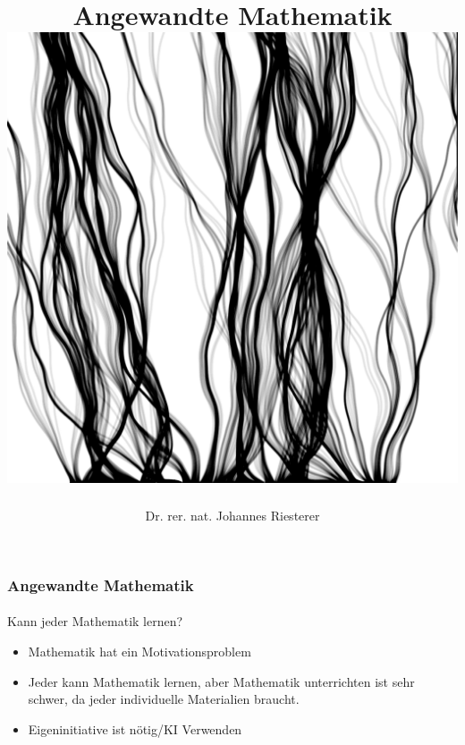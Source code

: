 \documentclass{beamer}
\begin{document}
\title[Angewandte Mathematik] %
{Angewandte Mathematik
\\
\includegraphics[scale=0.15]{images/cover}
}
\subtitle{}
\author[Dr. Johannes Riesterer] %
{Dr.  rer. nat. Johannes Riesterer}

\date[KPT 2004] %
{}

\subject{Angewandte Mathematik}

\frame{\titlepage}

\begin{frame}
    \frametitle{Angewandte Mathematik}
\framesubtitle{}
    \begin{block}{Kann jeder Mathematik lernen?}
\begin{itemize}
 \item Mathematik hat ein Motivationsproblem
\item Jeder kann Mathematik lernen, aber Mathematik unterrichten ist sehr schwer, da jeder individuelle Materialien braucht.
 \item Eigeninitiative ist nötig/KI Verwenden

\end{itemize}
\end{block}

 \end{frame}
\end{document}

